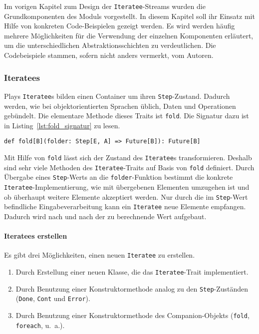 \documentclass[draft=false
              ,paper=a4
              ,twoside=false
              ,fontsize=11pt
              ,headsepline
              ,BCOR10mm
              ,DIV11
              ]{scrbook}
\begin{document}
Im vorigen Kapitel zum Design der \lstinline|Iteratee|-Streams wurden die Grundkomponenten des Moduls vorgestellt.
In diesem Kapitel soll ihr Einsatz mit Hilfe von konkreten Code-Beispielen gezeigt werden.
Es wird werden häufig mehrere Möglichkeiten für die Verwendung der einzelnen Komponenten erläutert, um die unterschiedlichen Abstraktionsschichten zu verdeutlichen.
Die Codebeispiele stammen, sofern nicht anders vermerkt, vom Autoren.


\subsubsection{Iteratees} %
\label{sssec:iteratees}

Plays \lstinline|Iteratee|s bilden einen Container um ihren \lstinline|Step|-Zustand.
Dadurch werden, wie bei objektorientierten Sprachen üblich, Daten und Operationen gebündelt.
Die elementare Methode dieses Traits ist \lstinline|fold|.
Die Signatur dazu ist in Listing~\ref{lst:fold_signatur} zu lesen.
\begin{lstlisting}[caption=Die Signatur von fold, label=lst:fold_signatur]
def fold[B](folder: Step[E, A] => Future[B]): Future[B]
\end{lstlisting}

Mit Hilfe von \lstinline|fold| lässt sich der Zustand des \lstinline|Iteratee|s transformieren.
Deshalb sind sehr viele Methoden des \lstinline|Iteratee|-Traits auf Basis von \lstinline|fold| definiert.
Durch Übergabe eines \lstinline|Step|-Werts an die \lstinline|folder|-Funktion bestimmt die konkrete \lstinline|Iteratee|-Implementierung, wie mit übergebenen Elementen umzugehen ist und ob überhaupt weitere Elemente akzeptiert werden.
Nur durch die im \lstinline|Step|-Wert befindliche Eingabeverarbeitung kann ein \lstinline|Iteratee| neue Elemente empfangen.
Dadurch wird nach und nach der zu berechnende Wert aufgebaut.

\paragraph{Iteratees erstellen} %
\label{par:iteratees_erstellen}\mbox{} %

Es gibt drei Möglichkeiten, einen neuen \lstinline|Iteratee| zu erstellen.
\begin{enumerate}
  \item Durch Erstellung einer neuen Klasse, die das \lstinline|Iteratee|-Trait implementiert.
  \item Durch Benutzung einer Konstruktormethode analog zu den \lstinline|Step|-Zuständen (\lstinline|Done|, \lstinline|Cont| und \lstinline|Error|).
  \item Durch Benutzung einer Konstruktormethode des Companion-Objekts (\lstinline|fold|, \lstinline|foreach|, u.~a.).
\end{enumerate}
\end{document}
